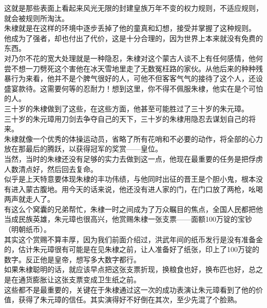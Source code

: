 \begin{multicols}{\theparacolNo}
这就是那些表面上看起来风光无限的封建皇族万年不变的权力规则，不适应规则，就会被规则所淘汰。\\

朱棣就是在这样的环境中逐步丢掉了他的童真和幻想，接受并掌握了这种规则。\\

他成为了强者，却也付出了代价，这是十分合理的，因为世界上本来就没有免费的东西。\\

对乃尔不花的宽大处理就是一种隐忍，朱棣对这个蒙古人谈不上有任何感情，他何尝不想一刀劈死这个害他在冰天雪地里走了无数冤枉路的家伙。从他后来的种种残暴行为来看，他并不是个脾气很好的人，可他不但客客气气的接待了这个人，还设盛宴款待。这需要何等的忍耐力！想到这里，你不得不佩服朱棣，他实在是个可怕的人。\\

三十岁的朱棣做到了这些，在这些方面，他甚至可能胜过了三十岁的朱元璋。\\

三十岁的朱元璋用刀剑去争夺自己的天下，三十岁的朱棣用隐忍去谋划自己的将来。\\

朱棣就像一个优秀的体操运动员，省略了所有花哨和不必要的动作，将全部的心力放在那最后的腾跃，以获得冠军的奖赏——皇位。\\

当然，当时的朱棣还没有足够的实力去做到这一点，他现在最重要的任务是把俘虏人数清点好，然后回去复命。\\

似乎是上天特意要体现朱棣的丰功伟绩，与他同时出征的晋王是个胆小鬼，根本没有进入蒙古腹地。用今天的话来说，他还没有进人家的门，在门口放了两枪，吆喝两声就走人了。\\

有这么个窝囊的兄弟帮忙，朱棣一时之间成为了万众瞩目的焦点，全国人民都把他当成民族英雄，朱元璋也很高兴，他赏赐朱棣一张支票——面额100万锭的宝钞（明朝纸币）。\\

其实这个赏赐不算丰厚，因为我们前面介绍过，洪武年间的纸币发行是没有准备金的，估计朱元璋很有可能是在见朱棣之前，让人准备好了纸张，印上了100万锭的数字。反正他是皇帝，想写多大数字都行。\\

如果朱棣聪明的话，就应该早点把这张支票折现，换粮食也好，换布匹也好，总之是在通货膨胀让这张支票变成卫生纸之前。\\

这些都不是最重要的，关键在于朱棣通过这一次的成功表演让朱元璋看到了他的价值，获得了朱元璋的信任。其实演得好不好倒在其次，至少先混了个脸熟。\\


\end{multicols}
